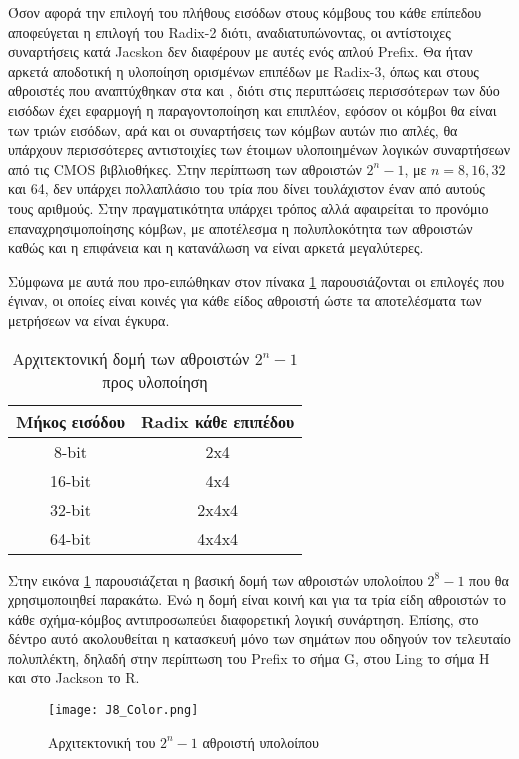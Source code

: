 Όσον αφορά την επιλογή του πλήθους εισόδων στους κόμβους του κάθε επίπεδου αποφεύγεται η επιλογή του Radix-2 διότι, αναδιατυπώνοντας, οι αντίστοιχες συναρτήσεις κατά Jacskon δεν διαφέρουν με αυτές ενός απλού Prefix. Θα ήταν αρκετά αποδοτική η υλοποίηση ορισμένων επιπέδων με Radix-3,  όπως και στους αθροιστές που αναπτύχθηκαν στα \cite{6189978} και \cite{6810474}, διότι στις περιπτώσεις περισσότερων των δύο εισόδων έχει εφαρμογή η παραγοντοποίηση και επιπλέον, εφόσον οι κόμβοι θα είναι των τριών εισόδων, αρά και οι συναρτήσεις των κόμβων αυτών πιο απλές, θα υπάρχουν περισσότερες αντιστοιχίες των έτοιμων υλοποιημένων λογικών συναρτήσεων από τις CMOS βιβλιοθήκες. Στην περίπτωση των αθροιστών $2^n-1$, με $n=8, 16, 32$ και 64, δεν υπάρχει πολλαπλάσιο του τρία που δίνει τουλάχιστον έναν από αυτούς τους αριθμούς. Στην πραγματικότητα υπάρχει τρόπος αλλά αφαιρείται το προνόμιο επαναχρησιμοποίησης κόμβων, με αποτέλεσμα η πολυπλοκότητα των αθροιστών καθώς και η επιφάνεια και η κατανάλωση να είναι αρκετά μεγαλύτερες. 

Σύμφωνα με αυτά που προ-ειπώθηκαν στον πίνακα \ref{tb:arch_2^n-1} παρουσιάζονται οι επιλογές που έγιναν, οι οποίες είναι κοινές για κάθε είδος αθροιστή ώστε τα αποτελέσματα των μετρήσεων να είναι έγκυρα.
\begin{table}[H]
\centering
     \begin{tabular}{ || c | c || } 
     \hline
     Μήκος εισόδου & Radix κάθε επιπέδου\\
     \hline\hline
     8-bit  & 2x4 \\
     16-bit & 4x4 \\
     32-bit & 2x4x4 \\
     64-bit & 4x4x4 \\
     \hline
     \end{tabular}
     \caption{Αρχιτεκτονική δομή των αθροιστών $2^n-1$ προς υλοποίηση}
     \label{tb:arch_2^n-1}
\end{table}

Στην εικόνα \ref{2^8-1_Tree_2x4} παρουσιάζεται η βασική δομή των αθροιστών υπολοίπου $2^8-1$ που θα χρησιμοποιηθεί παρακάτω. Ενώ η δομή είναι κοινή και για τα τρία είδη αθροιστών το κάθε σχήμα-κόμβος αντιπροσωπεύει διαφορετική λογική συνάρτηση. Επίσης, στο δέντρο αυτό ακολουθείται η κατασκευή μόνο των σημάτων που οδηγούν τον τελευταίο πολυπλέκτη, δηλαδή στην περίπτωση του Prefix το σήμα G, στου Ling το σήμα H και στο Jackson το R.
\begin{figure}[H]
    \centering
    \texttt{[image: J8\_Color.png]}
    \caption{Αρχιτεκτονική του $2^n-1$ αθροιστή υπολοίπου}
    \label{2^8-1_Tree_2x4}
\end{figure}

















